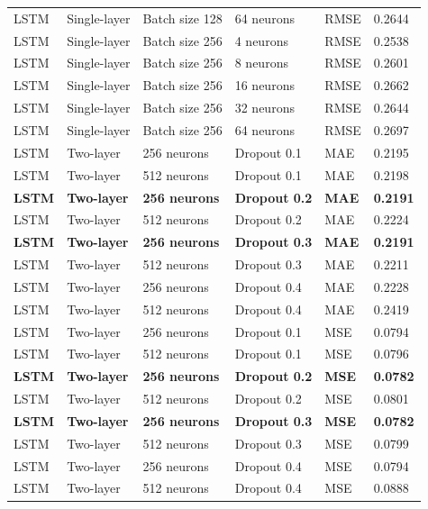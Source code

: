 \begin{landscape}
\begin{longtable}{p{2.2cm}p{3cm}p{3.5cm}p{3.2cm}p{1.6cm}p{1.8cm}}
LSTM & Single-layer & Batch size 128 & 64 neurons & RMSE & 0.2644 \\
LSTM & Single-layer & Batch size 256 & 4 neurons  & RMSE & 0.2538 \\
LSTM & Single-layer & Batch size 256 & 8 neurons  & RMSE & 0.2601 \\
LSTM & Single-layer & Batch size 256 & 16 neurons & RMSE & 0.2662 \\
LSTM & Single-layer & Batch size 256 & 32 neurons & RMSE & 0.2644 \\
LSTM & Single-layer & Batch size 256 & 64 neurons & RMSE & 0.2697 \\

LSTM & Two-layer & 256 neurons & Dropout 0.1 & MAE & 0.2195 \\
LSTM & Two-layer & 512 neurons & Dropout 0.1 & MAE & 0.2198 \\
\textbf{LSTM} & \textbf{Two-layer} & \textbf{256 neurons} & \textbf{Dropout 0.2} & \textbf{MAE} & \textbf{0.2191} \\
LSTM & Two-layer & 512 neurons & Dropout 0.2 & MAE & 0.2224 \\
\textbf{LSTM} & \textbf{Two-layer} & \textbf{256 neurons} & \textbf{Dropout 0.3} & \textbf{MAE} & \textbf{0.2191} \\
LSTM & Two-layer & 512 neurons & Dropout 0.3 & MAE & 0.2211 \\
LSTM & Two-layer & 256 neurons & Dropout 0.4 & MAE & 0.2228 \\
LSTM & Two-layer & 512 neurons & Dropout 0.4 & MAE & 0.2419 \\

LSTM & Two-layer & 256 neurons & Dropout 0.1 & MSE & 0.0794 \\
LSTM & Two-layer & 512 neurons & Dropout 0.1 & MSE & 0.0796 \\
\textbf{LSTM} & \textbf{Two-layer} & \textbf{256 neurons} & \textbf{Dropout 0.2} & \textbf{MSE} & \textbf{0.0782} \\
LSTM & Two-layer & 512 neurons & Dropout 0.2 & MSE & 0.0801 \\
\textbf{LSTM} & \textbf{Two-layer} & \textbf{256 neurons} & \textbf{Dropout 0.3} & \textbf{MSE} & \textbf{0.0782} \\
LSTM & Two-layer & 512 neurons & Dropout 0.3 & MSE & 0.0799 \\
LSTM & Two-layer & 256 neurons & Dropout 0.4 & MSE & 0.0794 \\
LSTM & Two-layer & 512 neurons & Dropout 0.4 & MSE & 0.0888 \\


\end{longtable}
\end{landscape}

